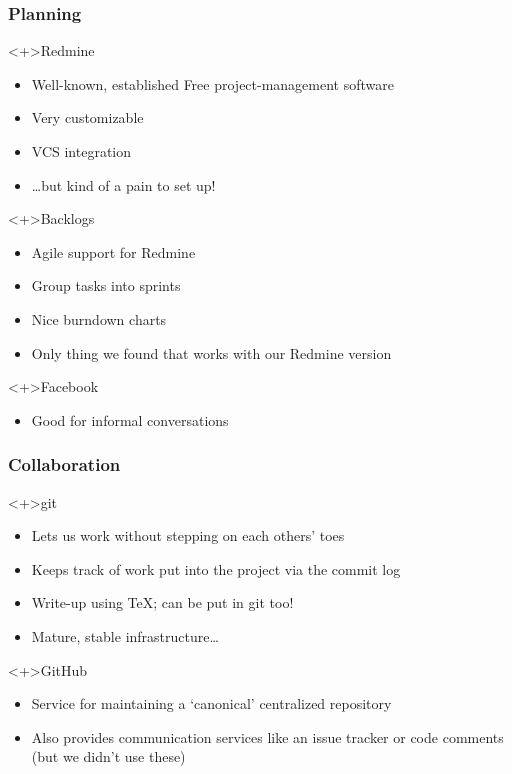 
\begin{frame}
  \frametitle{Planning}

  \begin{block}<+>{Redmine}
    \begin{itemize}
      \item Well-known, established Free project-management software
      \item Very customizable
      \item VCS integration
      \item \ldots but kind of a pain to set up!
    \end{itemize}
  \end{block}

  \begin{block}<+>{Backlogs}
    \begin{itemize}
      \item Agile support for Redmine
      \item Group tasks into sprints
      \item Nice burndown charts
      \item Only thing we found that works with our Redmine version \smiley
    \end{itemize}
  \end{block}

  \begin{block}<+>{Facebook}
    \begin{itemize}
      \item Good for informal conversations
    \end{itemize}
  \end{block}
\end{frame}

\begin{frame}
  \frametitle{Collaboration}

  \begin{block}<+>{git}
    \begin{itemize}
      \item Lets us work without stepping on each others' toes
      \item Keeps track of work put into the project via the commit log
      \item Write-up using \TeX; can be put in git too!
      \item Mature, stable infrastructure\ldots
    \end{itemize}
  \end{block}

  \begin{block}<+>{GitHub}
    \begin{itemize}
      \item Service for maintaining a `canonical' centralized repository
      \item Also provides communication services like an issue tracker
        or code comments (but we didn't use these)
    \end{itemize}
  \end{block}
\end{frame}